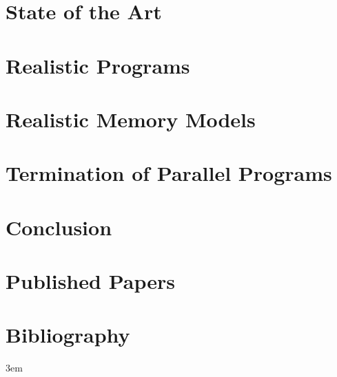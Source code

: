 \documentclass[11pt,twoside,a4paper]{book}
\theoremstyle{mydefstyle}
\begin{document}
\chapter{State of the Art}


\chapter{Realistic Programs} \label{chap:lang}


\chapter{Realistic Memory Models} \label{chap:mm}


\chapter{Termination of Parallel Programs} \label{chap:lnterm}


\chapter{Conclusion}

\appendix

\chapter{Published Papers}


\chapter{Bibliography}

{
    \emergencystretch 3em %
    \printbibliography[heading=none]
}
\end{document}
